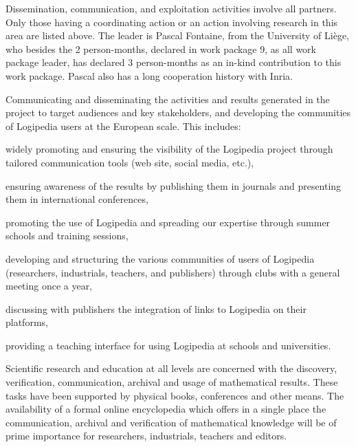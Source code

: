 \begin{workpackage}[id=dissemination,type=MGT,wphases=1-48,
  short={Dissemination},
  title={Dissemination, communication and exploitation},
  lead=Lie,LieRM=3,InrRM=6,BirRM=4,CleRM=2,ImtRM=2,StrRM=2,ZibRM=14,EduRM=12]

  Dissemination, communication, and exploitation activities involve
  all partners. Only 
  those having a coordinating
  action or an action involving research in this area are listed above. 
  The leader is
  Pascal Fontaine, from the University of Liège, who besides the 2
  person-months, declared in work package 9, as all work package
  leader, has declared 3 person-months as an in-kind contribution to
  this work package. Pascal also has a long cooperation history
  with Inria.

  \begin{wpobjectives}
    Communicating and disseminating the activities and results
    generated in the project to target audiences and key stakeholders,
    and developing the communities
    of Logipedia users at the European scale.
    This includes:
    \begin{compactitem}
    \item
      widely promoting and ensuring the visibility of the Logipedia project
      through tailored communication tools
      (web site, social media, etc.),
    \item ensuring awareness of the results by publishing them in
      journals and presenting them in international conferences,
    \item promoting the use of Logipedia and spreading our expertise
      through summer schools and training sessions,
    \item developing and structuring the various communities of users
      of Logipedia (researchers, industrials, teachers, and
      publishers) through clubs with a general meeting once a year,
    \item discussing with publishers the integration of links to
      Logipedia on their platforms,
    \item providing a teaching interface for using Logipedia at
      schools and universities.
    \end{compactitem}

    Scientific research and education at all levels are concerned with
    the discovery, verification, communication, archival and usage of
    mathematical results. These tasks have been supported by physical
    books, conferences and other means. The availability of a formal
    online encyclopedia which offers in a single place the
    communication, archival and verification of mathematical knowledge
    will be of prime importance for researchers, industrials, teachers
    and editors.


\end{wpobjectives}
\end{workpackage}
